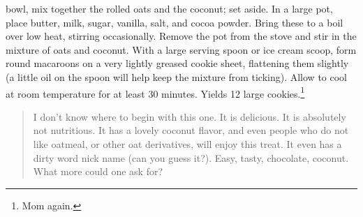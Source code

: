 \documentclass{tufte-book}
\begin{document}
 bowl, mix together the rolled oats and the coconut; set aside. In a large pot, place butter, milk, sugar, vanilla, salt, and cocoa powder. Bring these to a boil over low heat, stirring occasionally. Remove the pot from the stove and stir in the mixture of oats and coconut. With a large serving spoon or ice cream scoop, form round macaroons on a very lightly greased cookie sheet, flattening them slightly (a little oil on the spoon will help keep the mixture from ticking). Allow to cool at room temperature for at least 30 minutes. Yields 12 large cookies.\footnote{Mom again.}

\begin{quote}
	I don't know where to begin with this one. It is delicious. It is absolutely not nutritious. It has a lovely coconut flavor, and even people who do not like oatmeal, or other oat derivatives, will enjoy this treat. It even has a dirty word nick name (can you guess it?). Easy, tasty, chocolate, coconut. What more could one ask for?
\end{quote}

\backmatter

% 
% 


\printindex
\end{document}
